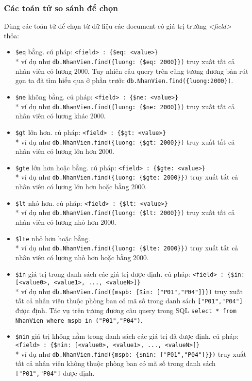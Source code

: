 \subsubsection{Các toán tử so sánh để chọn}
Dùng các toán tử để chọn từ dữ liệu các document có giá trị trường \textit{<field>} thỏa:
\begin{itemize}
\item \lstinline!$eq! bằng. cú pháp: \lstinline!<field> : {$eq: <value>}! \\* ví dụ như \lstinline!db.NhanVien.find({luong: {$eq: 2000}})! truy xuất tất cả nhân viên có lương 2000. Tuy nhiên câu query trên cũng tương đương bản rút gọn ta đã tìm hiểu qua ở phần trước \lstinline!db.NhanVien.find({luong:2000})!.
\item \lstinline!$ne! không bằng. cú pháp: \lstinline!<field> : {$ne: <value>}! \\* ví dụ như \lstinline!db.NhanVien.find({luong: {$ne: 2000}})! truy xuất tất cả nhân viên có lương khác 2000.
\item \lstinline!$gt! lớn hơn. cú pháp: \lstinline!<field> : {$gt: <value>}! \\* ví dụ như \lstinline!db.NhanVien.find({luong: {$gt: 2000}})! truy xuất tất cả nhân viên có lương lớn hơn 2000.
\item \lstinline!$gte! lớn hơn hoặc bằng. cú pháp: \lstinline!<field> : {$gte: <value>}! \\* ví dụ như \lstinline!db.NhanVien.find({luong: {$gte: 2000}})! truy xuất tất cả nhân viên có lương lớn hơn hoặc bằng 2000.
\item \lstinline!$lt! nhỏ hơn. cú pháp: \lstinline!<field> : {$lt: <value>}! \\* ví dụ như \lstinline!db.NhanVien.find({luong: {$lt: 2000}})! truy xuất tất cả nhân viên có lương nhỏ hơn 2000.
\item \lstinline!$lte! nhỏ hơn hoặc bằng. \\* ví dụ như \lstinline!db.NhanVien.find({luong: {$lte: 2000}})! truy xuất tất cả nhân viên có lương nhỏ hơn hoặc bằng 2000.
\item \lstinline!$in! giá trị trong danh sách các giá trị được định. cú pháp: \lstinline!<field> : {$in: [<value0>, <value1>, ..., <valueN>]}! \\* ví dụ như \lstinline!db.NhanVien.find({mspb: {$in: ["P01","P04"]}})! truy xuất tất cả nhân viên thuộc phòng ban có mã số	trong danh sách \lstinline!["P01","P04"]! được định. Tác vụ trên tương đương câu query trong SQL \lstinline!select * from NhanVien where mspb in ("P01","P04")!.
\item \lstinline!$nin! giá trị không nằm trong danh sách các giá trị đã được định. cú pháp: \lstinline!<field> : {$nin: [<value0>, <value1>, ..., <valueN>]}! \\* ví dụ như \lstinline!db.NhanVien.find({mspb: {$nin: ["P01","P04"]}})! truy xuất tất cả nhân viên không thuộc phòng ban có mã số	trong danh sách \lstinline!["P01","P04"]! được định.
\end{itemize}
